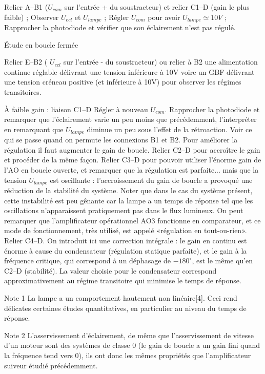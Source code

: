 \documentclass{article}%
\begin{document}
    Relier A--B1 ($U_{com}$ sur l'entrée + du soustracteur) et relier C1--D (gain le plus faible) ;
    Observer $U_{ecl}$ et $U_{lampe}$ ;
    Régler $U_{com}$ pour avoir $U_{lampe}\simeq10V$ ;
    Rapprocher la photodiode et vérifier que son éclairement n'est pas régulé.

Étude en boucle fermée

Relier E--B2 ( $U_{ecl}$ sur l'entrée - du soustracteur) ou relier à B2 une alimentation continue réglable délivrant une tension inférieure à 10V voire un GBF délivrant une tension créneau positive (et inférieure à 10V) pour observer les régimes transitoires.

    À faible gain : liaison C1--D
    Régler à nouveau $U_{com}$. Rapprocher la photodiode et remarquer que l'éclairement varie un peu moins que précédemment, l'interpréter en remarquant que $U_{lampe}$ diminue un peu sous l'effet de la rétroaction.
    Voir ce qui se passe quand on permute les connexions B1 et B2.
    Pour améliorer la régulation il faut augmenter le gain de boucle.
    Relier C2--D pour accroître le gain et procéder de la même façon.
    Relier C3--D pour pouvoir utiliser l'énorme gain de l'AO en boucle ouverte, et remarquer que la régulation est parfaite... mais que la tension $U_{lampe}$ est oscillante : l'accroissement du gain de boucle a provoqué une réduction de la stabilité du système.
    Noter que dans le cas du système présent, cette instabilité est peu gênante car la lampe a un temps de réponse tel que les oscillations n'apparaissent pratiquement pas dans le flux lumineux. On peut remarquer que l'amplificateur opérationnel AO3 fonctionne en comparateur, et ce mode de fonctionnement, très utilisé, est appelé «régulation en tout-ou-rien».
    Relier C4--D.
    On introduit ici une correction intégrale : le gain en continu est énorme à cause du condensateur (régulation statique parfaite), et le gain à la fréquence critique, qui correspond à un déphasage de $-180^{\circ}$, est le même qu'en C2--D (stabilité).
    La valeur choisie pour le condensateur correspond approximativement au régime transitoire qui minimise le temps de réponse.

Note 1 La lampe a un comportement hautement non linéaire[4]. Ceci rend délicates certaines études quantitatives, en particulier au niveau du temps de réponse.

Note 2 L'asservissement d'éclairement, de même que l'asservissement de vitesse d'un moteur sont des systèmes de classe 0 (le gain de boucle a un gain fini quand la fréquence tend vers 0), ils ont donc les mêmes propriétés que l'amplificateur suiveur étudié précédemment.
\end{document}
